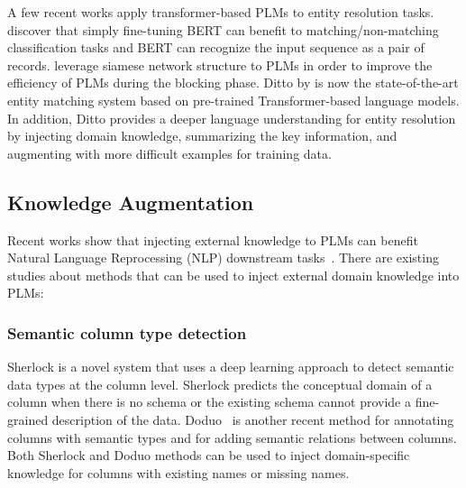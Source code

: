 A few recent works apply transformer-based PLMs to entity resolution tasks. \citet{paganelli_analyzing_2022} discover that simply fine-tuning BERT can benefit to matching/non-matching classification tasks and BERT can recognize the input sequence as a pair of records. \citet{li_improving_2021} leverage siamese network structure to PLMs in order to improve the efficiency of PLMs during the blocking phase. 
Ditto by \cite{li_deep_2020} is now the state-of-the-art entity matching system based on pre-trained Transformer-based language models. In addition, Ditto provides a deeper language understanding for entity resolution by injecting domain knowledge, summarizing the key information, and augmenting with more difficult examples for training data. 
 
\vspace{-0.5em}
\subsection{Knowledge Augmentation}
Recent works show that injecting external knowledge to PLMs can benefit Natural Language Reprocessing (NLP) downstream tasks~\cite{zhang_ernie_2019,peters_knowledge_2019,liu_k-bert_2020,wang_k-adapter_2021, wang_kepler_2021}. 
There are existing studies about methods that can be used to inject external domain knowledge into PLMs: 


\subsubsection{Semantic column type detection}
Sherlock \cite{hulsebos_sherlock_2019} is a novel system that uses a deep learning approach to detect semantic data types at the column level. Sherlock predicts the conceptual domain of a column when there is no schema or the existing schema cannot provide a fine-grained description of the data. Doduo~\cite{suhara_annotating_2022} is another recent method for annotating  columns with semantic types and for adding semantic relations between columns. Both Sherlock and Doduo methods can be used to inject domain-specific knowledge for columns with existing names or missing names.

